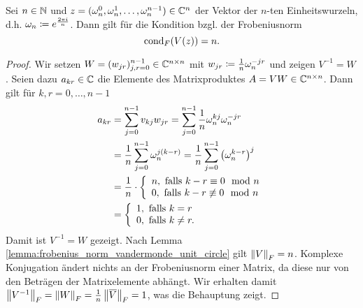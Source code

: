 \begin{lemma}
    \label{lemma:frobenius_condition_unit_roots}
    Sei $n \in \N$ und $z = (\wn^0, \wn^1, \dots, \wn^{n-1})  \in \Cn$ der Vektor der
    $n$-ten Einheitswurzeln, d.h. $\wn \defeq e^{\frac{2 \pi i}{n}}$.
    Dann gilt für die Kondition bzgl. der Frobeniusnorm
    \[
        \cond[F]{\Vand{z}} = n.
    \]
\end{lemma}
\begin{proof}
    Wir setzen $W = (w_{jr})_{j,r=0}^{n-1} \in \C^{n\times n}$ mit
    $w_{jr} \defeq \frac{1}{n} \wn^{-jr}$
    und zeigen $V^{-1} = W$.
    Seien dazu $a_{kr} \in \C$ die Elemente des Matrixproduktes
    $A = V W \in \C^{n\times n}$.
    Dann gilt für $k, r = 0, \dots, n-1$
    \[
        \begin{split}
            a_{kr}
            &= \sum_{j=0}^{n-1} v_{kj} w_{jr}
            = \sum_{j=0}^{n-1} \frac{1}{n} \wn^{kj} \wn^{-jr} \\
            &= \frac{1}{n} \sum_{j=0}^{n-1} \wn^{j (k-r)}
            = \frac{1}{n} \sum_{j=0}^{n-1} \left( \wn^{k-r} \right)^j\\
            &= \frac{1}{n} \cdot \left\{
                \begin{array}{ll}
                    n, \text{ falls } k-r \equiv 0 \mod n\\
                    0, \text{ falls } k-r \not\equiv 0 \mod n
                \end{array}
              \right.\\
            &= \left\{
                \begin{array}{ll}
                    1, \text{ falls } k = r \\
                    0, \text{ falls } k \neq r .
                \end{array}
              \right.
        \end{split}
    \]
    Damit ist $V^{-1} = W$ gezeigt.
    Nach Lemma \ref{lemma:frobenius_norm_vandermonde_unit_circle} gilt $\norm{V}_F = n$.
    Komplexe Konjugation ändert nichts an der Frobeniusnorm einer Matrix, da
    diese nur von den Beträgen der Matrixelemente abhängt.
    Wir erhalten damit $\norm{V^{-1}}_F = \norm{W}_F = \frac{1}{n}
    \norm{\overline V}_F = 1$, was die Behauptung zeigt.
\end{proof}

